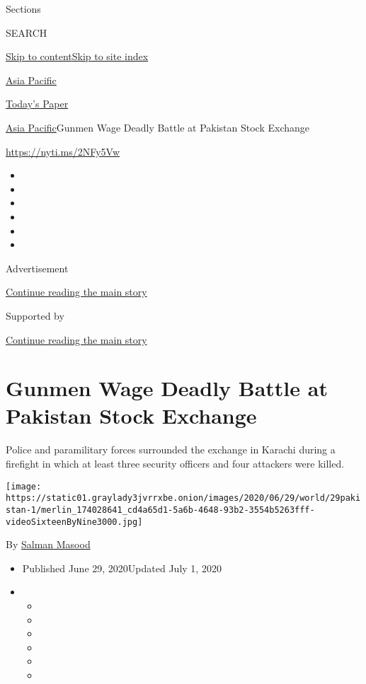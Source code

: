 Sections

SEARCH

\protect\hyperlink{site-content}{Skip to
content}\protect\hyperlink{site-index}{Skip to site index}

\href{https://www.nytimes3xbfgragh.onion/section/world/asia}{Asia
Pacific}

\href{https://myaccount.nytimes3xbfgragh.onion/auth/login?response_type=cookie\&client_id=vi}{}

\href{https://www.nytimes3xbfgragh.onion/section/todayspaper}{Today's
Paper}

\href{/section/world/asia}{Asia Pacific}\textbar{}Gunmen Wage Deadly
Battle at Pakistan Stock Exchange

\url{https://nyti.ms/2NFy5Vw}

\begin{itemize}
\item
\item
\item
\item
\item
\item
\end{itemize}

Advertisement

\protect\hyperlink{after-top}{Continue reading the main story}

Supported by

\protect\hyperlink{after-sponsor}{Continue reading the main story}

\hypertarget{gunmen-wage-deadly-battle-at-pakistan-stock-exchange}{%
\section{Gunmen Wage Deadly Battle at Pakistan Stock
Exchange}\label{gunmen-wage-deadly-battle-at-pakistan-stock-exchange}}

Police and paramilitary forces surrounded the exchange in Karachi during
a firefight in which at least three security officers and four attackers
were killed.

\texttt{[image: https://static01.graylady3jvrrxbe.onion/images/2020/06/29/world/29pakistan-1/merlin\_174028641\_cd4a65d1-5a6b-4648-93b2-3554b5263fff-videoSixteenByNine3000.jpg]}

By \href{https://www.nytimes3xbfgragh.onion/by/salman-masood}{Salman
Masood}

\begin{itemize}
\item
  Published June 29, 2020Updated July 1, 2020
\item
  \begin{itemize}
  \item
  \item
  \item
  \item
  \item
  \item
  \end{itemize}
\end{itemize}

